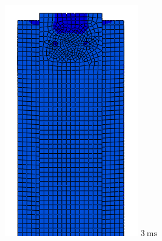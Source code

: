 \documentclass[
documentsize = a4, %
font = cmr, %
typesize = 11, %
printmode = true,
onehalfspacing = true,
language = en, %
titlepage = udciccp, %
degree = pt, %
dedication = true,
acknowledgements = true,
abstract-en = true,
abstract-es = false,
abstract-ga = false,
epigraphs = true,
toc = true,
lof = true,
lot = true,
frontmatterintoc = false,
notation = false,
minimal = false,
]{UDCthesis}
\begin{document}
\begin{figure}
	\centering
	\begin{minipage}[b]{.15\linewidth}
		\centering
		\includegraphics[width=\linewidth]{IMG_CUTRES/c1}
		$\SI{3}{\ms}$
	\end{minipage}
	\quad
	\begin{minipage}[b]{.15\linewidth}

\end{minipage}
\end{figure}
\end{document}
